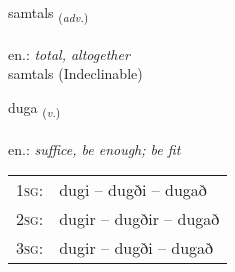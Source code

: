 \documentclass[frontgrid, backgrid]{flacards}\usepackage[]{graphicx}\usepackage[]{xcolor}
\begin{document}

\renewcommand{\flhead}{\vskip5pt \fboxsep=0pt {\small\bfseries\footnotesize Atviksorð | Adverb}}
\renewcommand{\fcfoot}{\vskip5pt \fboxsep=0pt \hspace{2pt}{\small\bfseries\footnotesize 2K}}

\renewcommand{\blhead}{\vskip5pt {\small\bfseries\footnotesize Atviksorð | Adverb }}
\renewcommand{\bcfoot}{\vskip5pt \hspace{2pt}{\small\bfseries\footnotesize 2K}}


{samtals \small{\textsubscript{(\textit{adv.})}} \\[1ex]
\textphonetic{[samtʰals]} \\
en.: \emph{total, altogether} \\  [2ex]
samtals (Indeclinable)}

\renewcommand{\flhead}{\vskip5pt \fboxsep=0pt {\small\bfseries\footnotesize Sagnorð | Verb}}
\renewcommand{\fcfoot}{\vskip5pt \fboxsep=0pt \hspace{2pt}{\small\bfseries\footnotesize 2K}}

\renewcommand{\blhead}{\vskip5pt {\small\bfseries\footnotesize Sagnorð | Verb }}
\renewcommand{\bcfoot}{\vskip5pt \hspace{2pt}{\small\bfseries\footnotesize 2K}}


{duga \small{\textsubscript{(\textit{v.})}} \\[1ex] %
\textphonetic{[tʏːɣa]} \\
en.: \emph{suffice, be enough; be fit} \\  [2ex]
\renewcommand*{\arraystretch}{0.8}
\begin{tabular}{p{1cm}l}
\textsc{1sg}: & dugi -- dugði -- dugað \\ 
\textsc{2sg}: & dugir -- dugðir -- dugað \\ 
\textsc{3sg}: & dugir -- dugði -- dugað \\ 
\end{tabular}
}

\renewcommand{\flhead}{\vskip5pt \fboxsep=0pt {\small\bfseries\footnotesize Sagnorð | Verb}}
\renewcommand{\fcfoot}{\vskip5pt \fboxsep=0pt \hspace{2pt}{\small\bfseries\footnotesize 2K}}
\end{document}

